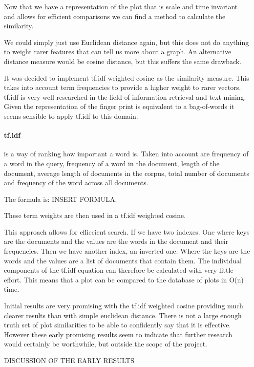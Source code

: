 Now that we have a representation of the plot that is scale and time invariant and allows for efficient comparisons we can find a method to calculate the similarity.

We could simply just use Euclidean distance again, but this does not do anything to weight rarer features that can tell us more about a graph.  An alternative distance measure would be cosine distance, but this suffers the same drawback.

It was decided to implement tf.idf weighted cosine as the similarity measure.  This takes into account term frequencies to provide a higher weight to rarer vectors.  tf.idf is very well researched in the field of information retrieval and text mining.  Given the representation of the finger print is equivalent to a bag-of-words it seems sensible to apply tf.idf to this domain.

\paragraph{tf.idf} is a way of ranking how important a word is.  Taken into account are frequency of a word in the query, frequency of a word in the document, length of the document, average length of documents in the corpus, total number of documents and frequency of the word across all documents.

The formula is: INSERT FORMULA.

These term weights are then used in a tf.idf weighted cosine.

This approach allows for effiecient search.  If we have two indexes.  One where keys are the documents and the values are the words in the document and their frequencies. Then we have another index, an inverted one.  Where the keys are the words and the values are a list of documents that contain them.  The individual components of the tf.idf equation can therefore be calculated with very little effort.  This means that a plot can be compared to the database of plots in O(n) time.

Initial results are very promising with the tf.idf weighted cosine providing much clearer results than with simple euclidean distance.  There is not a large enough truth set of plot similarities to be able to confidently say that it is effective.  However these early promising results seem to indicate that further research would certainly be worthwhile, but outside the scope of the project.

DISCUSSION OF THE EARLY RESULTS

